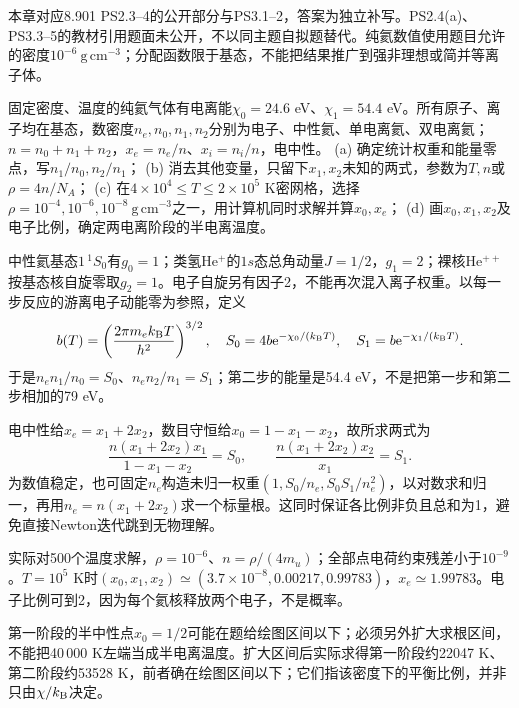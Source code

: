 本章对应8.901 PS2.3--4的公开部分与PS3.1--2，答案为独立补写。PS2.4(a)、PS3.3--5的教材引用题面未公开，不以同主题自拟题替代。纯氦数值使用题目允许的密度$10^{-6}\ \mathrm{g\,cm^{-3}}$；分配函数限于基态，不能把结果推广到强非理想或简并等离子体。

\begin{exercise}
固定密度、温度的纯氦气体有电离能$\chi_0=24.6$ eV、$\chi_1=54.4$ eV。所有原子、离子均在基态，数密度$n_e,n_0,n_1,n_2$分别为电子、中性氦、单电离氦、双电离氦；$n=n_0+n_1+n_2$，$x_e=n_e/n$、$x_i=n_i/n$，电中性。
(a) 确定统计权重和能量零点，写$n_1/n_0,n_2/n_1$；
(b) 消去其他变量，只留下$x_1,x_2$未知的两式，参数为$T,n$或$\rho=4n/N_A$；
(c) 在$4\times10^4\leq T\leq2\times10^5$ K密网格，选择$\rho=10^{-4},10^{-6},10^{-8}\ \mathrm{g\,cm^{-3}}$之一，用计算机同时求解并算$x_0,x_e$；
(d) 画$x_0,x_1,x_2$及电子比例，确定两电离阶段的半电离温度。
\end{exercise}
\begin{solution}
中性氦基态$1\,{}^1S_0$有$g_0=1$；类氢He$^+$的$1s$态总角动量$J=1/2$，$g_1=2$；裸核He$^{++}$按基态核自旋零取$g_2=1$。电子自旋另有因子2，不能再次混入离子权重。以每一步反应的游离电子动能零为参照，定义
\[
 b(T)=\left(\frac{2\pi m_ek_{\mathrm B} T}{h^2}\right)^{3/2},\quad
 S_0=4b\mathrm e^{-\chi_0/(k_{\mathrm B} T)},\quad
 S_1=b\mathrm e^{-\chi_1/(k_{\mathrm B} T)}.
\]
于是$n_en_1/n_0=S_0$、$n_en_2/n_1=S_1$；第二步的能量是54.4 eV，不是把第一步和第二步相加的79 eV。

电中性给$x_e=x_1+2x_2$，数目守恒给$x_0=1-x_1-x_2$，故所求两式为
\[
 \frac{n(x_1+2x_2)x_1}{1-x_1-x_2}=S_0,\qquad
 \frac{n(x_1+2x_2)x_2}{x_1}=S_1.
\]
为数值稳定，也可固定$n_e$构造未归一权重$(1,S_0/n_e,S_0S_1/n_e^2)$，以对数求和归一，再用$n_e=n(x_1+2x_2)$求一个标量根。这同时保证各比例非负且总和为1，避免直接Newton迭代跳到无物理解。

实际对500个温度求解，$\rho=10^{-6}$、$n=\rho/(4m_u)$；全部点电荷约束残差小于$10^{-9}$。$T=10^5$ K时$(x_0,x_1,x_2)\simeq(3.7\times10^{-8},0.00217,0.99783)$，$x_e\simeq1.99783$。电子比例可到2，因为每个氦核释放两个电子，不是概率。
\begin{center}\end{center}
第一阶段的半中性点$x_0=1/2$可能在题给绘图区间以下；必须另外扩大求根区间，不能把40\,000 K左端当成半电离温度。扩大区间后实际求得第一阶段约22047 K、第二阶段约53528 K，前者确在绘图区间以下；它们指该密度下的平衡比例，并非只由$\chi/k_{\mathrm B}$决定。
\end{solution}

